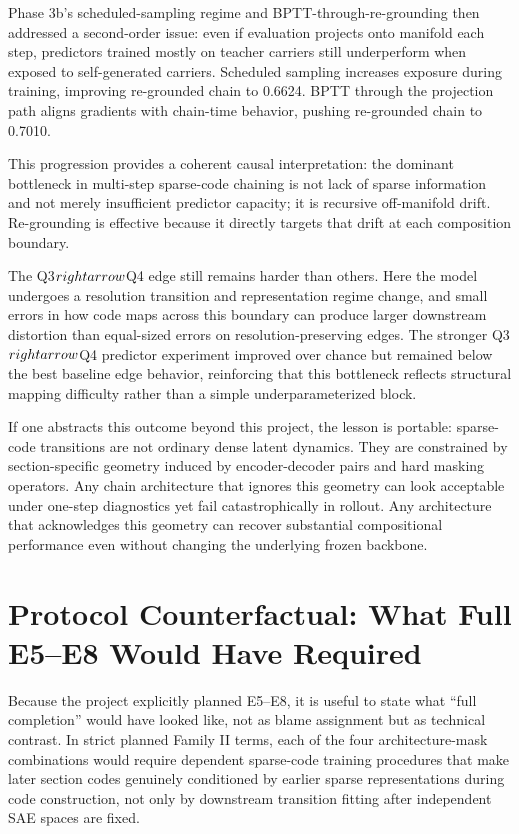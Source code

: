 \documentclass[11pt]{article}
\begin{document}
Phase 3b's scheduled-sampling regime and BPTT-through-re-grounding then addressed a second-order issue: even if evaluation projects onto manifold each step, predictors trained mostly on teacher carriers still underperform when exposed to self-generated carriers. Scheduled sampling increases exposure during training, improving re-grounded chain to 0.6624. BPTT through the projection path aligns gradients with chain-time behavior, pushing re-grounded chain to 0.7010.

This progression provides a coherent causal interpretation: the dominant bottleneck in multi-step sparse-code chaining is not lack of sparse information and not merely insufficient predictor capacity; it is recursive off-manifold drift. Re-grounding is effective because it directly targets that drift at each composition boundary.

The Q3$\\rightarrow$Q4 edge still remains harder than others. Here the model undergoes a resolution transition and representation regime change, and small errors in how code maps across this boundary can produce larger downstream distortion than equal-sized errors on resolution-preserving edges. The stronger Q3$\\rightarrow$Q4 predictor experiment improved over chance but remained below the best baseline edge behavior, reinforcing that this bottleneck reflects structural mapping difficulty rather than a simple underparameterized block.

If one abstracts this outcome beyond this project, the lesson is portable: sparse-code transitions are not ordinary dense latent dynamics. They are constrained by section-specific geometry induced by encoder-decoder pairs and hard masking operators. Any chain architecture that ignores this geometry can look acceptable under one-step diagnostics yet fail catastrophically in rollout. Any architecture that acknowledges this geometry can recover substantial compositional performance even without changing the underlying frozen backbone.

\section{Protocol Counterfactual: What Full E5--E8 Would Have Required}
Because the project explicitly planned E5--E8, it is useful to state what ``full completion'' would have looked like, not as blame assignment but as technical contrast. In strict planned Family II terms, each of the four architecture-mask combinations would require dependent sparse-code training procedures that make later section codes genuinely conditioned by earlier sparse representations during code construction, not only by downstream transition fitting after independent SAE spaces are fixed.
\end{document}
